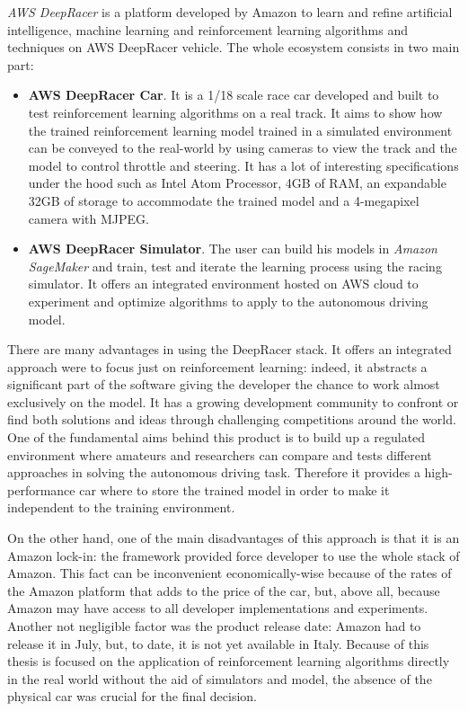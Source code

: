 \textit{AWS DeepRacer} is a platform developed by Amazon to learn and refine artificial intelligence, machine learning and reinforcement learning algorithms and techniques on AWS DeepRacer vehicle.
The whole ecosystem consists in two main part:
\begin{itemize}
\item \textbf{AWS DeepRacer Car}. It is a 1/18 scale race car developed and built to test reinforcement learning algorithms on a real track. It aims to show how the trained reinforcement learning model trained in a simulated environment can be conveyed to the real-world by using cameras to view the track and the model to control throttle and steering. It has a lot of interesting specifications under the hood such as Intel Atom\textsuperscript{\textregistered} Processor, 4GB of RAM, an expandable 32GB of storage to accommodate the trained model and a 4-megapixel camera with MJPEG.
\item \textbf{AWS DeepRacer Simulator}. The user can build his models in \textit{Amazon SageMaker} and train, test and iterate the learning process using the racing simulator. It offers an integrated environment hosted on AWS cloud to experiment and optimize algorithms to apply to the autonomous driving model.
\end{itemize}

There are many advantages in using the DeepRacer stack. It offers an integrated approach were to focus just on reinforcement learning: indeed, it abstracts a significant part of the software giving the developer the chance to work almost exclusively on the model. It has a growing development community to confront or find both solutions and ideas through challenging competitions around the world. One of the fundamental aims behind this product is to build up a regulated environment where amateurs and researchers can compare and tests different approaches in solving the autonomous driving task. Therefore it provides a high-performance car where to store the trained model in order to make it independent to the training environment.

On the other hand, one of the main disadvantages of this approach is that it is an Amazon lock-in: the framework provided force developer to use the whole stack of Amazon. This fact can be inconvenient economically-wise because of the rates of the Amazon platform that adds to the price of the car, but, above all, because Amazon may have access to all developer implementations and experiments. 
Another not negligible factor was the product release date: Amazon had to release it in July, but, to date, it is not yet available in Italy. Because of this thesis is focused on the application of reinforcement learning algorithms directly in the real world without the aid of simulators and model, the absence of the physical car was crucial for the final decision.

